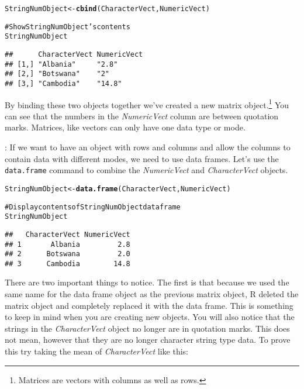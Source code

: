 \documentclass[ChapterTOCs,krantz1]{krantz}\usepackage{graphicx, color}
\makeatletter
\newcommand{\hlfunctioncall}[1]{\textcolor[rgb]{0.501960784313725,0,0.329411764705882}{\textbf{#1}}}%
\newcommand{\hlcomment}[1]{\textcolor[rgb]{0.180392156862745,0.6,0.341176470588235}{#1}}%
\newenvironment{kframe}{%
 \def\at@end@of@kframe{}%
 \ifinner\ifhmode%
  \def\at@end@of@kframe{\end{minipage}}%
  \begin{minipage}{\columnwidth}%
 \fi\fi%
 \def\FrameCommand##1{\hskip\@totalleftmargin \hskip-\fboxsep
 \colorbox{shadecolor}{##1}\hskip-\fboxsep
     \hskip-\linewidth \hskip-\@totalleftmargin \hskip\columnwidth}%
 \MakeFramed {\advance\hsize-\width
   \@totalleftmargin\z@ \linewidth\hsize
   \@setminipage}}%
 {\par\unskip\endMakeFramed%
 \at@end@of@kframe}
\newenvironment{knitrout}{}{} %
\makeatother
\begin{document}
\begin{knitrout}
\color{fgcolor}\begin{kframe}
\begin{alltt}
StringNumObject <- \hlfunctioncall{cbind}(CharacterVect, NumericVect)

\hlcomment{# Show StringNumObject's contents}
StringNumObject
\end{alltt}
\begin{verbatim}
##      CharacterVect NumericVect
## [1,] "Albania"     "2.8"      
## [2,] "Botswana"    "2"        
## [3,] "Cambodia"    "14.8"
\end{verbatim}
\end{kframe}
\end{knitrout}


\noindent By binding these two objects together we've created a new matrix object.\footnote{Matrices are vectors with columns as well as rows.} You can see that the numbers in the {\emph{NumericVect}} column are between quotation marks. Matrices, like vectors can only have one data type or mode. 

: If we want to have an object with rows and columns and allow the columns to contain data with different modes, we need to use data frames. Let's use the \texttt{data.frame} command to combine the {\emph{NumericVect}} and {\emph{CharacterVect}} objects.

\begin{knitrout}
\color{fgcolor}\begin{kframe}
\begin{alltt}
StringNumObject <- \hlfunctioncall{data.frame}(CharacterVect, NumericVect)

\hlcomment{# Display contents of StringNumObject data frame}
StringNumObject
\end{alltt}
\begin{verbatim}
##   CharacterVect NumericVect
## 1       Albania         2.8
## 2      Botswana         2.0
## 3      Cambodia        14.8
\end{verbatim}
\end{kframe}
\end{knitrout}


\noindent There are two important things to notice. The first is that because we used the same name for the data frame object as the previous matrix object, R deleted the matrix object and completely replaced it with the data frame. This is something to keep in mind when you are creating new objects. You will also notice that the strings in the {\emph{CharacterVect}} object no longer are in quotation marks. This does not mean, however that they are no longer character string type data. To prove this try taking the mean of {\emph{CharacterVect}} like this:
\end{document}
